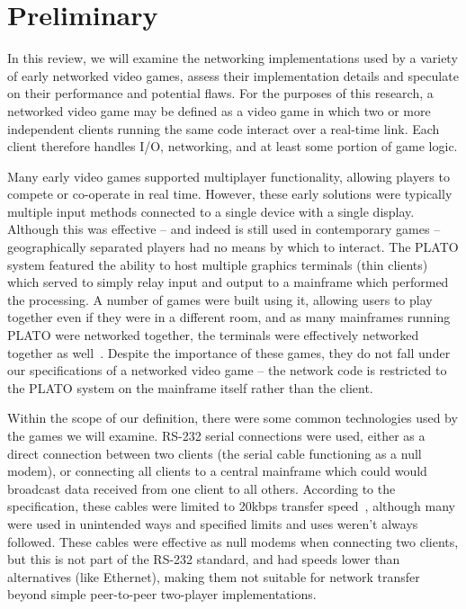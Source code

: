 \section{Preliminary}\label{sec:pre}


In this review, we will examine the networking implementations used by a variety of early networked video games, assess their implementation details and speculate on their performance and potential flaws. For the purposes of this research, a networked video game may be defined as a video game in which two or more independent clients running the same code interact over a real-time link. Each client therefore handles I/O, networking, and at least some portion of game logic.

Many early video games supported multiplayer functionality, allowing players to compete or co-operate in real time. However, these early solutions were typically multiple input methods connected to a single device with a single display. Although this was effective -- and indeed is still used in contemporary games -- geographically separated players had no means by which to interact.
The PLATO system featured the ability to host multiple graphics terminals (thin clients) which served to simply relay input and output to a mainframe which performed the processing. A number of games were built using it, allowing users to play together even if they were in a different room, and as many mainframes running PLATO were networked together, the terminals were effectively networked together as well~\cite{plato}.
Despite the importance of these games, they do not fall under our specifications of a networked video game -- the network code is restricted to the PLATO system on the mainframe itself rather than the client.

Within the scope of our definition, there were some common technologies used by the games we will examine. RS-232 serial connections were used, either as a direct connection between two clients (the serial cable functioning as a null modem), or connecting all clients to a central mainframe which could would broadcast data received from one client to all others. According to the specification, these cables were limited to 20kbps transfer speed~\cite{Buchanan2004}, although many were used in unintended ways and specified limits and uses weren't always followed. These cables were effective as null modems when connecting two clients, but this is not part of the RS-232 standard, and had speeds lower than alternatives (like Ethernet), making them not suitable for network transfer beyond simple peer-to-peer two-player implementations.

